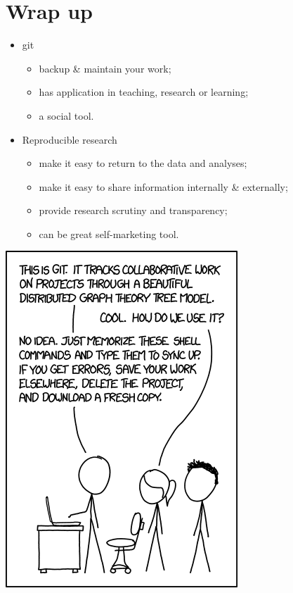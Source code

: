 \documentclass[11pt]{beamer}
\begin{document}

\section{Wrap up}

\begin{frame}
\begin{itemize}
	\item git
	\begin{itemize}
		\item backup & maintain your work;
		\item has application in teaching, research or learning;
		\item a social tool.
	\end{itemize}
	\item Reproducible research
	\begin{itemize}
		\item make it easy to return to the data and analyses;
		\item make it easy to share information internally \& externally;
		\item provide research scrutiny and transparency;
		\item can be great self-marketing tool.
	\end{itemize}
\end{itemize}
\end{frame}


\begin{frame}
\centering
\includegraphics[height=.8\textheight]{pic/git.png}
\end{frame}
\end{document}

